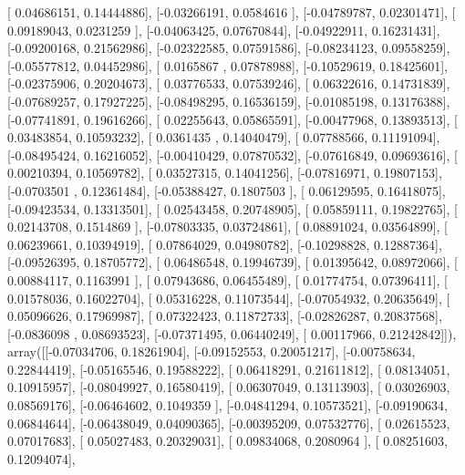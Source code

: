 \documentclass{article}
\begin{document}
       [ 0.04686151,  0.14444886],
       [-0.03266191,  0.0584616 ],
       [-0.04789787,  0.02301471],
       [ 0.09189043,  0.0231259 ],
       [-0.04063425,  0.07670844],
       [-0.04922911,  0.16231431],
       [-0.09200168,  0.21562986],
       [-0.02322585,  0.07591586],
       [-0.08234123,  0.09558259],
       [-0.05577812,  0.04452986],
       [ 0.0165867 ,  0.07878988],
       [-0.10529619,  0.18425601],
       [-0.02375906,  0.20204673],
       [ 0.03776533,  0.07539246],
       [ 0.06322616,  0.14731839],
       [-0.07689257,  0.17927225],
       [-0.08498295,  0.16536159],
       [-0.01085198,  0.13176388],
       [-0.07741891,  0.19616266],
       [ 0.02255643,  0.05865591],
       [-0.00477968,  0.13893513],
       [ 0.03483854,  0.10593232],
       [ 0.0361435 ,  0.14040479],
       [ 0.07788566,  0.11191094],
       [-0.08495424,  0.16216052],
       [-0.00410429,  0.07870532],
       [-0.07616849,  0.09693616],
       [ 0.00210394,  0.10569782],
       [ 0.03527315,  0.14041256],
       [-0.07816971,  0.19807153],
       [-0.0703501 ,  0.12361484],
       [-0.05388427,  0.1807503 ],
       [ 0.06129595,  0.16418075],
       [-0.09423534,  0.13313501],
       [ 0.02543458,  0.20748905],
       [ 0.05859111,  0.19822765],
       [ 0.02143708,  0.1514869 ],
       [-0.07803335,  0.03724861],
       [ 0.08891024,  0.03564899],
       [ 0.06239661,  0.10394919],
       [ 0.07864029,  0.04980782],
       [-0.10298828,  0.12887364],
       [-0.09526395,  0.18705772],
       [ 0.06486548,  0.19946739],
       [ 0.01395642,  0.08972066],
       [ 0.00884117,  0.1163991 ],
       [ 0.07943686,  0.06455489],
       [ 0.01774754,  0.07396411],
       [ 0.01578036,  0.16022704],
       [ 0.05316228,  0.11073544],
       [-0.07054932,  0.20635649],
       [ 0.05096626,  0.17969987],
       [ 0.07322423,  0.11872733],
       [-0.02826287,  0.20837568],
       [-0.0836098 ,  0.08693523],
       [-0.07371495,  0.06440249],
       [ 0.00117966,  0.21242842]]), array([[-0.07034706,  0.18261904],
       [-0.09152553,  0.20051217],
       [-0.00758634,  0.22844419],
       [-0.05165546,  0.19588222],
       [ 0.06418291,  0.21611812],
       [ 0.08134051,  0.10915957],
       [-0.08049927,  0.16580419],
       [ 0.06307049,  0.13113903],
       [ 0.03026903,  0.08569176],
       [-0.06464602,  0.1049359 ],
       [-0.04841294,  0.10573521],
       [-0.09190634,  0.06844644],
       [-0.06438049,  0.04090365],
       [-0.00395209,  0.07532776],
       [ 0.02615523,  0.07017683],
       [ 0.05027483,  0.20329031],
       [ 0.09834068,  0.2080964 ],
       [ 0.08251603,  0.12094074],
\end{document}

